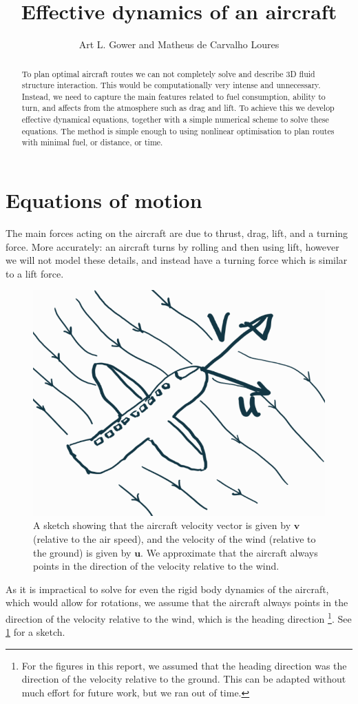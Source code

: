 \documentclass{article}
\title{Effective dynamics of an aircraft}
\author{Art L. Gower and Matheus de Carvalho Loures}
\renewcommand{\vec}[1]{\boldsymbol{#1}}
\begin{document}
\maketitle

\begin{abstract}
    To plan optimal aircraft routes we can not completely solve and describe 3D fluid structure interaction. This would be computationally very intense and unnecessary. Instead, we need to capture the main features related to fuel consumption, ability to turn, and affects from the atmosphere such as drag and lift. To achieve this we develop effective dynamical equations, together with a simple numerical scheme to solve these equations. The method is simple enough to using nonlinear optimisation to plan routes with minimal fuel, or distance, or time.  
\end{abstract}

\section{Equations of motion}
The main forces acting on the aircraft are due to thrust, drag, lift, and a turning force. More accurately: an aircraft turns by rolling and then using lift, however we will not model these details, and instead have a turning force which is similar to a lift force.

\begin{figure}[ht]
    \centering
    \includegraphics[width = 0.4\linewidth]{"plane-sketch.png"}
    \caption{A sketch showing that the aircraft velocity vector is given by $\vec v$ (relative to the air speed), and the velocity of the wind (relative to the ground) is given by $\vec u$. We approximate that the aircraft always points in the direction of the velocity relative to the wind.}
    \label{fig:plane-sketch}
\end{figure}

As it is impractical to solve for even the rigid body dynamics of the aircraft, which would allow for rotations, we assume that the aircraft always points in the direction of the velocity relative to the wind, which is the heading direction \footnote{For the figures in this report, we assumed that the heading direction was the direction of the velocity relative to the ground. This can be adapted without much effort for future work, but we ran out of time.}. See \cref{fig:plane-sketch} for a sketch. 
\end{document}
